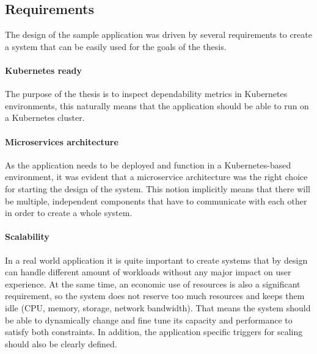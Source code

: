 \subsection{Requirements} \label{sample-app-requirements}


The design of the sample application was driven by several requirements to create a system that can be easily used for the goals of the thesis.

\paragraph{Kubernetes ready}The purpose of the thesis is to inspect dependability metrics in Kubernetes environments, this naturally means that the application should be able to run on a Kubernetes cluster.

\paragraph{Microservices architecture}As the application needs to be deployed and function in a Kubernetes-based environment, it was evident that a microservice architecture was the right choice for starting the design of the system. This notion implicitly means that there will be multiple, independent components that have to communicate with each other in order to create a whole system.

\paragraph{Scalability}In a real world application it is quite important to create systems that by design can handle different amount of workloads without any major impact on user experience. At the same time, an economic use of resources is also a significant requirement, so the system does not reserve too much resources and keeps them idle (\eg CPU, memory, storage, network bandwidth). That means the system should be able to dynamically change and fine tune its capacity and performance to satisfy both constraints. In addition, the application specific triggers for scaling should also be clearly defined.


